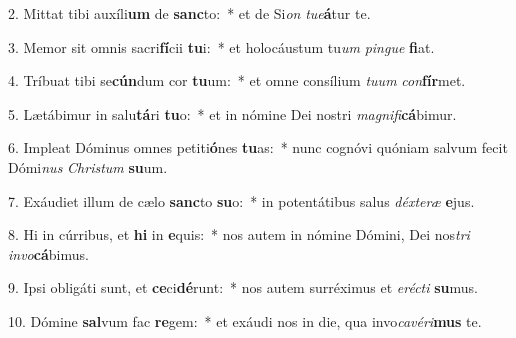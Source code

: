 2. Mittat tibi auxíli\textbf{um} de \textbf{sanc}to:~*  et de Si\textit{on} \textit{tu}\textit{e}\textbf{á}tur te.\

3. Memor sit omnis sacri\textbf{fí}cii \textbf{tu}i:~*  et holocáustum tu\textit{um} \textit{pin}\textit{gue} \textbf{fi}at.\

4. Tríbuat tibi se\textbf{cún}dum cor \textbf{tu}um:~*  et omne consílium \textit{tu}\textit{um} \textit{con}\textbf{fír}met.\

5. Lætábimur in salu\textbf{tá}ri \textbf{tu}o:~*  et in nómine Dei nostri \textit{ma}\textit{gni}\textit{fi}\textbf{cá}bimur.\

6. Impleat Dóminus omnes petiti\textbf{ó}nes \textbf{tu}as:~*  nunc cognóvi quóniam salvum fecit Dómi\textit{nus} \textit{Chris}\textit{tum} \textbf{su}um.\

7. Exáudiet illum de cælo \textbf{sanc}to \textbf{su}o:~*  in potentátibus salus \textit{déx}\textit{te}\textit{ræ} \textbf{e}jus.\

8. Hi in cúrribus, et \textbf{hi} in \textbf{e}quis:~*  nos autem in nómine Dómini, Dei nos\textit{tri} \textit{in}\textit{vo}\textbf{cá}bimus.\

9. Ipsi obligáti sunt, et \textbf{ce}ci\textbf{dé}runt:~*  nos autem surréximus et \textit{e}\textit{réc}\textit{ti} \textbf{su}mus.\

10. Dómine \textbf{sal}vum fac \textbf{re}gem:~*  et exáudi nos in die, qua invo\textit{ca}\textit{vé}\textit{ri}\textbf{mus} te.\

